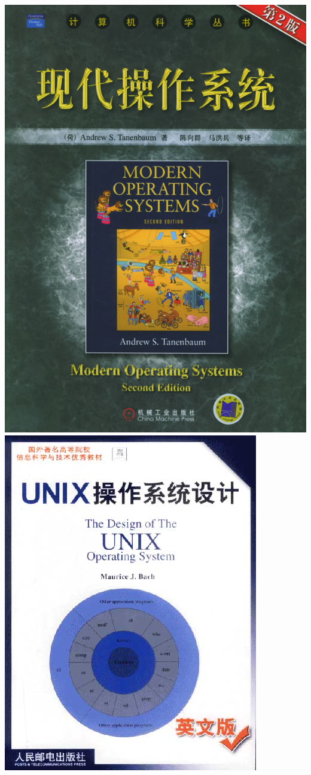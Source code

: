 \documentclass[CJKutf8,xcolor=pdftex,dvipsnames,table]{beamer}
\begin{document}
\begin{CJK*}{UTF8}{song}
\begin{frame}
\begin{itemize}
\begin{center}
	    	\includegraphics[scale=0.2]{mosv2}  \pause
			\hspace{1mm}
	    	\includegraphics[scale=0.15]{uos}    \pause

\end{center}
\end{itemize}
\end{frame}
\end{CJK*}
\end{document}
